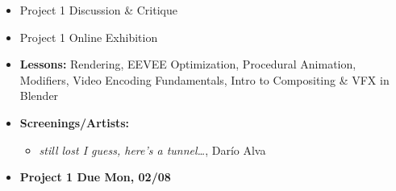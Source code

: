 \def\dMon{Mon, 02/08}
\def\dTues{Tues, 02/09}
\def\dWed{Wed, 02/10}
\def\dThur{Thur, 02/11}
\def\dFri{Fri, 02/12}
\def\dSat{Sat, 02/13}
\def\dSun{Sun, 02/14}
\placeDate





% 
\begin{itemize}[noitemsep,topsep=0pt,leftmargin=*]
    \item Project 1 Discussion \& Critique
    \item Project 1 Online Exhibition
\end{itemize}
\vspace{1em}
\begin{itemize}[noitemsep,topsep=0pt,leftmargin=*]
    \item \textbf{Lessons:} Rendering, EEVEE Optimization, Procedural Animation, Modifiers, Video Encoding Fundamentals, Intro to Compositing \& VFX in Blender
    \item \textbf{Screenings/Artists:}
    \begin{itemize}
        \item \emph{still lost I guess, here’s a tunnel\dots}, Darío Alva
        \end{itemize}
    \item \textcolor{defaultColor}{\textbf{Project 1 Due \dMon}}
\end{itemize}